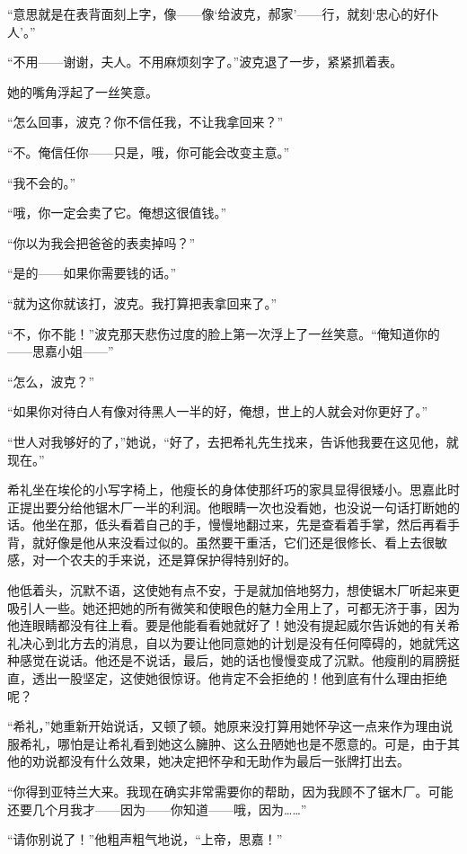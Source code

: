 \par “意思就是在表背面刻上字，像——像‘给波克，郝家’——行，就刻‘忠心的好仆人’。”
\par “不用——谢谢，夫人。不用麻烦刻字了。”波克退了一步，紧紧抓着表。
\par 她的嘴角浮起了一丝笑意。
\par “怎么回事，波克？你不信任我，不让我拿回来？”
\par “不。俺信任你——只是，哦，你可能会改变主意。”
\par “我不会的。”
\par “哦，你一定会卖了它。俺想这很值钱。”
\par “你以为我会把爸爸的表卖掉吗？”
\par “是的——如果你需要钱的话。”
\par “就为这你就该打，波克。我打算把表拿回来了。”
\par “不，你不能！”波克那天悲伤过度的脸上第一次浮上了一丝笑意。“俺知道你的——思嘉小姐——”
\par “怎么，波克？”
\par “如果你对待白人有像对待黑人一半的好，俺想，世上的人就会对你更好了。”
\par “世人对我够好的了，”她说，“好了，去把希礼先生找来，告诉他我要在这见他，就现在。”
\par 希礼坐在埃伦的小写字椅上，他瘦长的身体使那纤巧的家具显得很矮小。思嘉此时正提出要分给他锯木厂一半的利润。他眼睛一次也没看她，也没说一句话打断她的话。他坐在那，低头看着自己的手，慢慢地翻过来，先是查看着手掌，然后再看手背，就好像是他从来没看过似的。虽然要干重活，它们还是很修长、看上去很敏感，对一个农夫的手来说，还是算保护得特别好的。
\par 他低着头，沉默不语，这使她有点不安，于是就加倍地努力，想使锯木厂听起来更吸引人一些。她还把她的所有微笑和使眼色的魅力全用上了，可都无济于事，因为他连眼睛都没有往上看。要是他能看看她就好了！她没有提起威尔告诉她的有关希礼决心到北方去的消息，自以为要让他同意她的计划是没有任何障碍的，她就凭这种感觉在说话。他还是不说话，最后，她的话也慢慢变成了沉默。他瘦削的肩膀挺直，透出一股坚定，这使她很惊讶。他肯定不会拒绝的！他到底有什么理由拒绝呢？
\par “希礼，”她重新开始说话，又顿了顿。她原来没打算用她怀孕这一点来作为理由说服希礼，哪怕是让希礼看到她这么臃肿、这么丑陋她也是不愿意的。可是，由于其他的劝说都没有什么效果，她决定把怀孕和无助作为最后一张牌打出去。
\par “你得到亚特兰大来。我现在确实非常需要你的帮助，因为我顾不了锯木厂。可能还要几个月我才——因为——你知道——哦，因为……”
\par “请你别说了！”他粗声粗气地说，“上帝，思嘉！”
